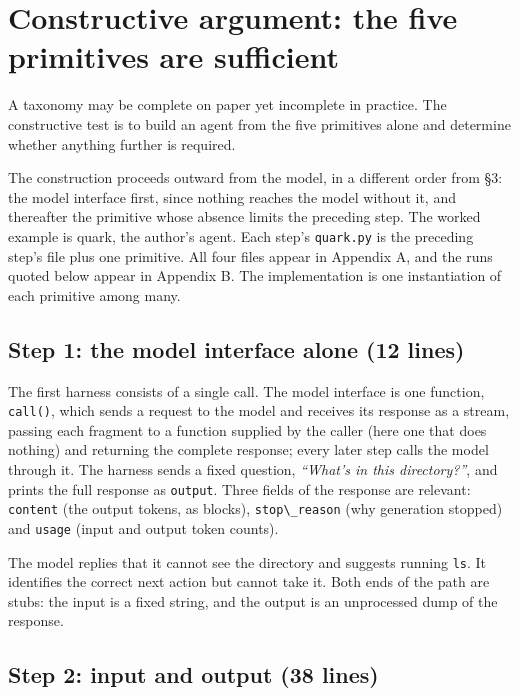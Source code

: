 \section{Constructive argument: the five primitives are sufficient}

A taxonomy may be complete on paper yet incomplete in practice. The constructive test is to build an agent from the five primitives alone and determine whether anything further is required.

The construction proceeds outward from the model, in a different order from §3: the model interface first, since nothing reaches the model without it, and thereafter the primitive whose absence limits the preceding step. The worked example is quark, the author's agent. Each step's \passthrough{\lstinline!quark.py!} is the preceding step's file plus one primitive. All four files appear in Appendix A, and the runs quoted below appear in Appendix B. The implementation is one instantiation of each primitive among many.

\subsection{Step 1: the model interface alone (12 lines)}

The first harness consists of a single call. The model interface is one function, \passthrough{\lstinline!call()!}, which sends a request to the model and receives its response as a stream, passing each fragment to a function supplied by the caller (here one that does nothing) and returning the complete response; every later step calls the model through it. The harness sends a fixed question, \emph{``What's in this directory?''}, and prints the full response as \passthrough{\lstinline!output!}. Three fields of the response are relevant: \passthrough{\lstinline!content!} (the output tokens, as blocks), \passthrough{\lstinline!stop\_reason!} (why generation stopped) and \passthrough{\lstinline!usage!} (input and output token counts).

The model replies that it cannot see the directory and suggests running \passthrough{\lstinline!ls!}. It identifies the correct next action but cannot take it. Both ends of the path are stubs: the input is a fixed string, and the output is an unprocessed dump of the response.

\subsection{Step 2: input and output (38 lines)}

